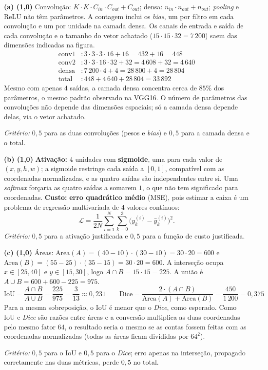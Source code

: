 \documentclass[11pt,a4paper]{article}
\begin{document}
\textbf{(a) (1{,}0)} Convolução: $K \cdot K \cdot C_{in} \cdot C_{out} + C_{out}$; densa: $n_{in} \cdot n_{out} + n_{out}$; \textit{pooling} e ReLU não têm parâmetros. A contagem inclui os \textit{bias}, um por filtro em cada convolução e um por unidade na camada densa. Os canais de entrada e saída de cada convolução e o tamanho do vetor achatado ($15 \cdot 15 \cdot 32 = 7\,200$) saem das dimensões indicadas na figura.
\begin{align*}
    \text{conv1}&: 3 \cdot 3 \cdot 3 \cdot 16 + 16 = 432 + 16 = 448 \\
    \text{conv2}&: 3 \cdot 3 \cdot 16 \cdot 32 + 32 = 4\,608 + 32 = 4\,640 \\
    \text{densa}&: 7\,200 \cdot 4 + 4 = 28\,800 + 4 = 28\,804 \\
    \text{total}&: 448 + 4\,640 + 28\,804 = 33\,892
\end{align*}
Mesmo com apenas $4$ saídas, a camada densa concentra cerca de $85\%$ dos parâmetros, o mesmo padrão observado na VGG16. O número de parâmetros das convoluções não depende das dimensões espaciais; só a camada densa depende delas, via o vetor achatado.

\textit{Critério:} $0{,}5$ para as duas convoluções (pesos e \textit{bias}) e $0{,}5$ para a camada densa e o total.

\textbf{(b) (1{,}0)} \textbf{Ativação:} $4$ unidades com \textbf{sigmoide}, uma para cada valor de $(x, y, h, w)$; a sigmoide restringe cada saída a $[0, 1]$, compatível com as coordenadas normalizadas, e as quatro saídas são independentes entre si. Uma \textit{softmax} forçaria as quatro saídas a somarem $1$, o que não tem significado para coordenadas. \textbf{Custo:} \textbf{erro quadrático médio} (MSE), pois estimar a caixa é um problema de regressão multivariada de $4$ valores contínuos:
\[
\mathcal{L} = \frac{1}{2N}\sum_{i=1}^{N}\sum_{k=0}^{3}\bigl(y_k^{(i)} - \hat{y}_k^{(i)}\bigr)^2.
\]
\textit{Critério:} $0{,}5$ para a ativação justificada e $0{,}5$ para a função de custo justificada.

\textbf{(c) (1{,}0)} Áreas: $\mathrm{Area}(A) = (40 - 10)\cdot(30 - 10) = 30 \cdot 20 = 600$ e $\mathrm{Area}(B) = (55 - 25)\cdot(35 - 15) = 30 \cdot 20 = 600$. A interseção ocupa $x \in [25, 40]$ e $y \in [15, 30]$, logo $A \cap B = 15 \cdot 15 = 225$. A união é $A \cup B = 600 + 600 - 225 = 975$.
\[
\mathrm{IoU} = \frac{A \cap B}{A \cup B} = \frac{225}{975} = \frac{3}{13} \approx 0{,}231
\qquad
\mathrm{Dice} = \frac{2 \cdot (A \cap B)}{\mathrm{Area}(A) + \mathrm{Area}(B)} = \frac{450}{1\,200} = 0{,}375
\]
Para a mesma sobreposição, o IoU é menor que o \textit{Dice}, como esperado. Como IoU e \textit{Dice} são razões entre áreas e a conversão multiplica as duas coordenadas pelo mesmo fator $64$, o resultado seria o mesmo se as contas fossem feitas com as coordenadas normalizadas (todas as áreas ficam divididas por $64^2$).

\textit{Critério:} $0{,}5$ para o IoU e $0{,}5$ para o \textit{Dice}; erro apenas na interseção, propagado corretamente nas duas métricas, perde $0{,}5$ no total.

\color{black}
\end{document}
